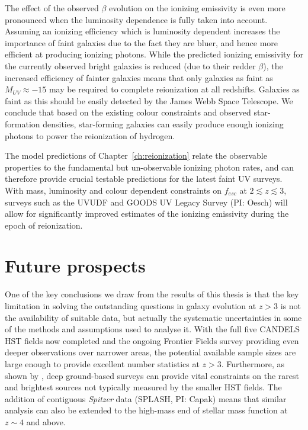 The effect of the observed $\beta$ evolution on the ionizing emissivity is even more pronounced when the luminosity dependence is fully taken into account. Assuming an ionizing efficiency which is luminosity dependent increases the importance of faint galaxies due to the fact they are bluer, and hence more efficient at producing ionizing photons. While the predicted ionizing emissivity for the currently observed bright galaxies is reduced (due to their redder $\beta$), the increased efficiency of fainter galaxies means that only galaxies as faint as $M_{UV} \approx -15$ may be required to complete reionization at all redshifts. Galaxies as faint as this should be easily detected by the James Webb Space Telescope. We conclude that based on the existing colour constraints and observed star-formation densities, star-forming galaxies can easily produce enough ionizing photons to power the reionization of hydrogen.

The model predictions of Chapter~\ref{ch:reionization} relate the observable properties to the fundamental but un-observable ionizing photon rates, and can therefore provide crucial testable predictions for the latest faint UV surveys. With mass, luminosity and colour dependent constraints on $f_{esc}$ at $2 \lesssim z \lesssim 3$, surveys such as the UVUDF \citep{Teplitz:2013jg} and GOODS UV Legacy Survey (PI: Oesch) will allow for significantly improved estimates of the ionizing emissivity during the epoch of reionization.

\section{Future prospects}\label{sec:conc-future}
One of the key conclusions we draw from the results of this thesis is that the key limitation in solving the outstanding questions in galaxy evolution at $z > 3$ is not the availability of suitable data, but actually the systematic uncertainties in some of the methods and assumptions used to analyse it. With the full five CANDELS HST fields now completed and the ongoing Frontier Fields survey providing even deeper observations over narrower areas, the potential available sample sizes are large enough to provide excellent number statistics at $z>3$. Furthermore, as shown by \citet{Bowler:vl,Bowler:2013wz}, deep ground-based surveys can provide vital constraints on the rarest and brightest sources not typically measured by the smaller HST fields. The addition of contiguous \emph{Spitzer} data (SPLASH, PI: Capak) means that similar analysis can also be extended to the high-mass end of stellar mass function at $z\sim 4$ and above.

